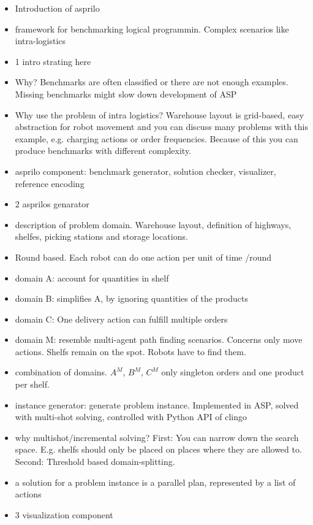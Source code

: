 \documentclass[runningheads]{llncs}
\begin{document}
\begin{itemize}
    \item Introduction of asprilo 
    \item framework for benchmarking logical programmin. Complex scenarios like intra-logistics
    \item 1 intro strating here
    \item Why? Benchmarks are often classified or there are not enough examples. Missing benchmarks might slow down development of ASP
    \item Why use the problem of intra logistics? Warehouse layout is grid-based, easy abstraction for robot movement and you can discuss many problems with this example, e.g. charging actions or order frequencies. Because of this you can produce benchmarks with different complexity. 
    \item asprilo component: benchmark generator, solution checker, visualizer, reference encoding 
    \item 2 asprilos genarator 
    \item description of problem domain. Warehouse layout, definition of highways, shelfes, picking stations and storage locations. 
    \item Round based. Each robot can do one action per unit of time /round
    \item domain A: account for quantities in shelf
    \item domain B: simplifies A, by ignoring quantities of the products
    \item domain C: One delivery action can fulfill multiple orders
    \item domain M: resemble multi-agent path finding scenarios. Concerns only move actions. Shelfs remain on the spot. Robots have to find them.
    \item combination of domains. $A^M$, $B^M$, $C^M$ only singleton orders and one product per shelf. 
    \item instance generator: generate problem instance. Implemented in ASP, solved with multi-shot solving, controlled with Python API of clingo
    \item why multishot/incremental solving? First:  You can narrow down the search space. E.g. shelfs should only be placed on places where they are allowed to. Second: Threshold based domain-splitting. 
    \item a solution for a problem instance is a parallel plan, represented by a list of actions
    \item 3 visualization component 

\end{itemize}
\end{document}
